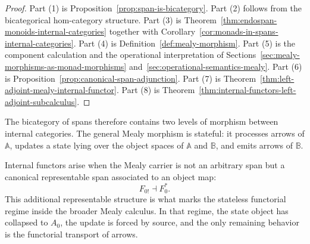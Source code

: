 \begin{proof}
Part (1) is Proposition~\ref{prop:span-is-bicategory}. Part (2) follows from the bicategorical hom-category structure. Part (3) is Theorem~\ref{thm:endospan-monoids-internal-categories} together with Corollary~\ref{cor:monads-in-spans-internal-categories}. Part (4) is Definition~\ref{def:mealy-morphism}. Part (5) is the component calculation and the operational interpretation of Sections~\ref{sec:mealy-morphisms-as-monad-morphisms} and~\ref{sec:operational-semantics-mealy}. Part (6) is Proposition~\ref{prop:canonical-span-adjunction}. Part (7) is Theorem~\ref{thm:left-adjoint-mealy-internal-functor}. Part (8) is Theorem~\ref{thm:internal-functors-left-adjoint-subcalculus}.
\end{proof}

\begin{remark}
\label{rem:stateful-versus-functorial}
The bicategory of spans therefore contains two levels of morphism between internal categories. The general Mealy morphism is stateful: it processes arrows of \(\mathbb A\), updates a state lying over the object spaces of \(\mathbb A\) and \(\mathbb B\), and emits arrows of \(\mathbb B\).

Internal functors arise when the Mealy carrier is not an arbitrary span but a canonical representable span associated to an object map:
\[
F_{0!}\dashv F_0^\ast.
\]
This additional representable structure is what marks the stateless functorial regime inside the broader Mealy calculus. In that regime, the state object has collapsed to \(A_0\), the update is forced by source, and the only remaining behavior is the functorial transport of arrows.
\end{remark}